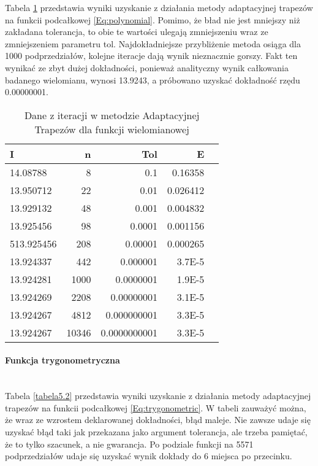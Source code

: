 \documentclass[12pt,twoside]{article}
\begin{document}
Tabela \ref{tabela5.1} przedstawia wyniki uzyskanie z działania metody adaptacyjnej trapezów na funkcii podcałkowej \eqref{Eq:polynomial}. Pomimo, że bład nie jest mniejszy niż zakładana tolerancja, to obie te wartości ulegają zmniejszeniu wraz ze zmniejszeniem parametru tol. Najdokładniejsze przybliżenie metoda osiąga dla 1000 podprzedziałów, kolejne iteracje dają wynik nieznacznie gorszy. Fakt ten wynikać ze zbyt dużej dokładności, ponieważ analityczny wynik całkowania badanego wielomianu, wynosi 13.9243, a próbowano uzyskać dokładność rzędu 0.00000001.

\begin{table}[H]
\centering 
\caption{Dane z iteracji w metodzie Adaptacyjnej Trapezów dla funkcji wielomianowej}
\label{tabela5.1}
\begin{tabular}{lrrrr}
\toprule
I &  n&  Tol &      E \\
\midrule
14.08788 &  8  &   0.1 & 0.16358\\
13.950712 &  22 &   0.01 & 0.026412\\
13.929132 &  48  &  0.001 & 0.004832 \\
13.925456 &  98  &  0.0001  & 0.001156 \\
513.925456 &  208  &  0.00001  &  0.000265 \\
13.924337 &  442  &  0.000001  & 3.7E-5 \\
13.924281 &  1000  &  0.0000001  & 1.9E-5 \\
13.924269 &  2208  &  0.00000001  & 3.1E-5 \\
13.924267 &  4812  &  0.000000001  & 3.3E-5 \\
13.924267 &  10346  &  0.0000000001  & 3.3E-5 \\
\bottomrule
\end{tabular}
\end{table}

\paragraph{Funkcja trygonometryczna}\mbox{} \\


Tabela \ref{tabela5.2} przedstawia wyniki uzyskanie z działania metody adaptacyjnej trapezów na funkcii podcałkowej \eqref{Eq:trygonometric}. W tabeli zauważyć można, że wraz ze wzrostem deklarowanej dokładności, błąd maleje. Nie zawsze udaje się uzyskać błąd taki jak przekazana jako argument tolerancja, ale trzeba pamiętać, że to tylko szacunek, a nie gwarancja. Po podziale funkcji na 5571 podprzedziałów udaje się uzyskać wynik dokłady do 6 miejsca po przecinku.
\end{document}
